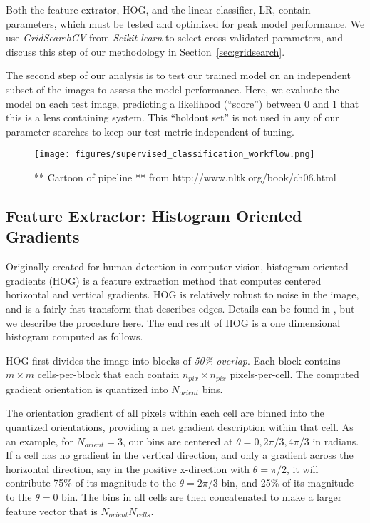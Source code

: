 \documentclass{emulateapj}
\newcommand{\wording}[1]{{\it\color{purple} #1}}
\begin{document}
Both the feature extrator, HOG, and the linear classifier, LR, contain
parameters, which must be tested and optimized for peak model
performance.  We use {\em GridSearchCV} from {\em Scikit-learn} to
select cross-validated parameters, and discuss this step of our
methodology in Section~\ref{sec:gridsearch}.

The second step of our analysis is to test our trained model on an
independent subset of the images to assess the model performance.
Here, we evaluate the model on each test image, predicting a
likelihood (``score'') between 0 and 1 that this is a lens containing
system.  This ``holdout set'' is not used in any of our parameter
searches to keep our test metric independent of tuning.

\begin{figure}[t]\label{fig:pipeline}
\begin{center}
\texttt{[image: figures/supervised\_classification\_workflow.png]}
\caption{** Cartoon of pipeline ** from
  http://www.nltk.org/book/ch06.html}
\end{center}
\end{figure}

\subsection{Feature Extractor: Histogram Oriented Gradients}\label{sec:hog}
Originally created for human detection in computer vision, histogram
oriented gradients (HOG) is a feature extraction method that computes
centered horizontal and vertical gradients. HOG is relatively robust
to noise in the image, and is a fairly fast transform that describes
edges.  Details can be found in \citet{dalalandtriggs_05}, but we
describe the procedure here.  The end result of HOG is a one
dimensional histogram computed as follows.

HOG first divides the image into blocks of \wording{50\% overlap}.
Each block contains $m\times m$ cells-per-block that each contain
$n_{pix}\times n_{pix}$ pixels-per-cell.  The computed gradient
orientation is quantized into $N_{orient}$ bins.

The orientation gradient of all pixels within each cell are binned
into the quantized orientations, providing a net gradient description
within that cell.  As an example, for $N_{orient}=3$, our bins are
centered at $\theta=0, 2\pi/3, 4\pi/3$ in radians.  If a cell has no
gradient in the vertical direction, and only a gradient across the
horizontal direction, say in the positive x-direction with
$\theta=\pi/2$, it will contribute 75\% of its magnitude to the
$\theta=2\pi/3$ bin, and 25\% of its magnitude to the $\theta=0$ bin.
The bins in all cells are then concatenated to make a larger feature
vector that is $N_{orient}$\times$N_{cells}$.
\end{document}
